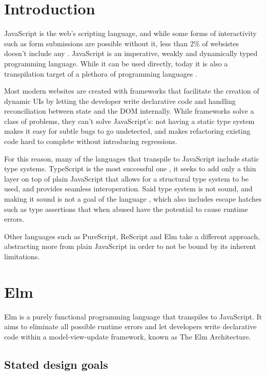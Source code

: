 \chapter*{Introduction}
\setcounter{page}{1}

JavaScript is the web's scripting language, and while some forms of interactivity such as form submissions are possible without it, less than 2\% of websistes doesn't include any \cite{noauthor_usage_nodate}. JavaScript is an imperative, weakly and dynamically typed programming language. While it can be used directly, today it is also a transpilation target of a plethora of programming languages \cite{noauthor_list_nodate}.

Most modern websites are created with frameworks that facilitate the creation of dynamic UIs by letting the developer write declarative code and handling reconciliation between state and the DOM internally. While frameworks solve a class of problems, they can't solve JavaScript's: not having a static type system makes it easy for subtle bugs to go undetected, and makes refactoring existing code hard to complete without introducing regressions.

For this reason, many of the languages that transpile to JavaScript include static type systems. TypeScript is the most successful one \cite{noauthor_most_nodate}, it seeks to add only a thin layer on top of plain JavaScript that allows for a structural type system to be used, and provides seamless interoperation. Said type system is not sound, and making it sound is not a goal of the language \cite{noauthor_typescript_nodate}, which also includes escape hatches such as type assertions that when abused have the potential to cause runtime errors.

Other languages such as PureScript, ReScript and Elm take a different approach, abstracting more from plain JavaScript in order to not be bound by its inherent limitations.

\chapter{Elm}
Elm is a purely functional programming language that transpiles to JavaScript. It aims to eliminate all possible runtime errors and let developers write declarative code within a model-view-update framework, known as The Elm Architecture.

\section{Stated design goals}

